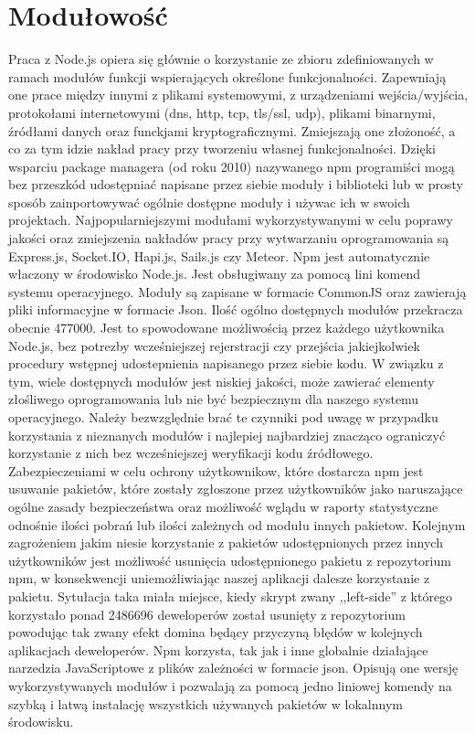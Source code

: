 \documentclass[12pt]{report}
\begin{document}
\section{Modułowość}
Praca z Node.js opiera się głównie o korzystanie ze zbioru zdefiniowanych w ramach modułów funkcji wspierających określone funkcjonalności. 
Zapewniają one prace między innymi z plikami systemowymi, z urządzeniami wejścia/wyjścia, protokołami internetowymi (dns, http, tcp, tls/ssl, udp), plikami binarnymi, źródłami danych oraz funckjami kryptograficznymi. 
Zmiejszają one złożoność, a co za tym idzie nakład pracy przy tworzeniu własnej funkcjonalności. 
Dzięki wsparciu package managera (od roku 2010) nazywanego npm programiści mogą bez przeszkód udostępniać napisane przez siebie moduły i biblioteki lub w prosty sposób zainportowywać ogólnie dostępne moduły i używac ich w swoich projektach. 
Najpopularniejszymi modułami wykorzystywanymi w celu poprawy jakości oraz zmiejszenia nakładów pracy przy wytwarzaniu oprogramowania są Express.js, Socket.IO, Hapi.js, Sails.js czy Meteor. 
Npm jest automatycznie właczony w środowisko Node.js. 
Jest obsługiwany za pomocą lini komend systemu operacyjnego. 
Moduły są zapisane w formacie CommonJS oraz zawierają pliki informacyjne w formacie Json. 
Ilość ogólno dostępnych modułów przekracza obecnie 477000. 
Jest to spowodowane możliwością przez każdego użytkownika Node.js, bez potrezby wcześniejszej rejerstracji czy przejścia jakiejkolwiek procedury wstępnej udostepnienia napisanego przez siebie kodu. 
W związku z tym, wiele dostępnych modułów jest niskiej jakości, może zawierać elementy złośliwego oprogramowania lub nie być bezpiecznym dla naszego systemu operacyjnego. 
Należy bezwzględnie brać te czynniki pod uwagę w przypadku korzystania z nieznanych modułów i najlepiej najbardziej znacząco ograniczyć korzystanie z nich bez wcześniejszej weryfikacji kodu źródłowego. 
Zabezpieczeniami w celu ochrony użytkownikow, które dostarcza npm jest usuwanie pakietów, które zostały zgłoszone przez użytkowników jako naruszające ogólne zasady bezpieczeństwa oraz możliwość wglądu w raporty statystyczne odnośnie ilości pobrań lub ilości zależnych od modułu innych pakietow. 
Kolejnym zagrożeniem jakim niesie korzystanie z pakietów udostępnionych przez innych użytkowników jest możliwość usunięcia udostępnionego pakietu z repozytorium npm, w konsekwencji uniemożliwiając naszej aplikacji dalesze korzystanie z pakietu. 
Sytułacja taka miała miejsce, kiedy skrypt zwany ,,left-side'' z którego korzystało ponad 2486696 deweloperów został usunięty z repozytorium powodując tak zwany efekt domina będący przyczyną błędów w kolejnych aplikacjach deweloperów. 
Npm korzysta, tak jak i inne globalnie działające narzedzia JavaScriptowe z plików zależności w formacie json. 
Opisują one wersję wykorzystywanych modułów i pozwalają za pomocą jedno liniowej komendy na szybką i latwą instalację wszystkich używanych pakietów w lokalnnym środowisku. 
\end{document}
